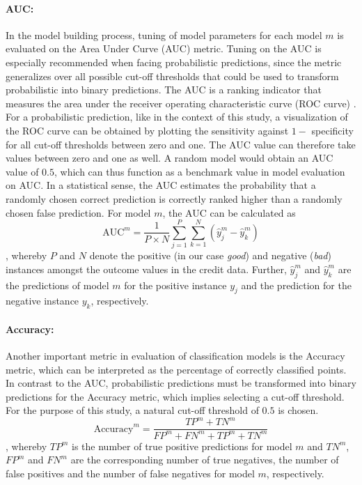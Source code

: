 \documentclass[12pt]{article}
\begin{document}
\paragraph{AUC:} In the model building process, tuning of model parameters for each model $m$ is evaluated on the Area Under Curve (AUC) metric. Tuning on the AUC is especially recommended when facing probabilistic predictions, since the metric generalizes over all possible cut-off thresholds that could be used to transform probabilistic into binary predictions. The AUC is a ranking indicator that measures the area under the receiver operating characteristic curve (ROC curve) \citep{hanley1982meaning}. For a probabilistic prediction, like in the context of this study, a visualization of the ROC curve can be obtained by plotting the sensitivity against $1 -$ specificity for all cut-off thresholds between zero and one. The AUC value can therefore take values between zero and one as well. A random model would obtain an AUC value of $0.5$, which can thus function as a benchmark value in model evaluation on AUC. In a statistical sense, the AUC estimates the probability that a randomly chosen correct prediction is correctly ranked higher than a randomly chosen false prediction. For model $m$, the AUC can be calculated as
\begin{equation}
\text{AUC}^m = \frac{1}{P \times N}\sum_{j=1}^{P}\sum_{k=1}^{N}(\hat{y}^m_j - \hat{y}^m_k)
\end{equation}
, whereby $P$ and $N$ denote the positive (in our case \textit{good}) and negative (\textit{bad}) instances amongst the outcome values in the credit data. Further, $\hat{y}^m_j$ and $\hat{y}^m_k$ are the predictions of model $m$ for the positive instance $y_j$ and the prediction for the negative instance $y_k$, respectively.

\paragraph{Accuracy:} Another important metric in evaluation of classification models is the Accuracy metric, which can be interpreted as the percentage of correctly classified points. In contrast to the AUC, probabilistic predictions must be transformed into binary predictions for the Accuracy metric, which implies selecting a cut-off threshold. For the purpose of this study, a natural cut-off threshold of $0.5$ is chosen.
\begin{equation}
\text{Accuracy}^m = \frac{TP^m + TN^m}{FP^m + FN^m + TP^m + TN^m}
\end{equation}
, whereby $TP^m$ is the number of true positive predictions for model $m$ and $TN^m$, $FP^m$ and $FN^m$ are the corresponding number of true negatives, the number of false positives and the number of false negatives for model $m$, respectively.
\end{document}
